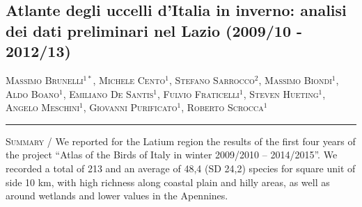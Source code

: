 \setcounter{figure}{0}
\setcounter{table}{0}

\begin{adjustwidth}{-3.5cm}{0cm}
\pagestyle{CIOpage}
\chapter*[Atlante degli uccelli svernanti del Lazio]{\bfseries
Atlante degli uccelli d{\textquoteright}Italia in inverno: analisi dei
dati preliminari nel Lazio (2009/10 - 2012/13)}

\textsc{Massimo Brunelli}$^{1*}$, \textsc{Michele Cento}$^{1}$, 
\textsc{Stefano Sarrocco}$^{2}$, \textsc{Massimo Biondi}$^{1}$, 
\textsc{Aldo Boano}$^{1}$, \textsc{Emiliano De Santis}$^{1}$, 
\textsc{Fulvio Fraticelli}$^{1}$, \textsc{Steven Hueting}$^{1}$, 
\textsc{Angelo Meschini}$^{1}$, \textsc{Giovanni Purificato}$^{1}$, 
\textsc{Roberto Scrocca}$^{1}$ \\

          
\noindent\color{MUSEBLUE}\rule{27cm}{2pt}
\vspace{1cm}
\end{adjustwidth}



{\small
\noindent \textsc{\color{MUSEBLUE} Summary} / We reported for the Latium region the results of the
first four years of the project
{\textquotedblleft}Atlas of the Birds of Italy in winter 2009/2010 --
2014/2015{\textquotedblright}. We recorded a total of 213
and an average of 48,4 (SD 24,2) species for square
unit of side 10 km, with high richness along coastal plain and hilly
areas, as well as around wetlands and lower values in the Apennines.
}


